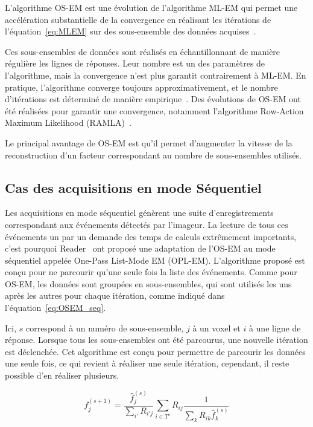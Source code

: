 L'algorithme OS-EM est une évolution de l'algorithme ML-EM  qui permet une accélération substantielle de la convergence en réalisant les itérations de l'équation~\ref{eq:MLEM} sur des sous-ensemble des données acquises~\cite{hudson1994accelerated}. 

Ces sous-ensembles de données sont réalisés en échantillonnant de manière régulière les lignes de réponses. Leur nombre est un des paramètres de l'algorithme, mais la convergence n'est plus garantit contrairement à ML-EM. En pratique, l'algorithme converge toujours approximativement, et le nombre d'itérations est déterminé de manière empirique~\cite{bailey2005positon}. Des évolutions de OS-EM ont été réalisées pour garantir une convergence, notamment l'algorithme Row-Action Maximum Likelihood (RAMLA)~\cite{browne1996row, chiang2004clinical}.

Le principal avantage de OS-EM est qu'il permet d'augmenter la vitesse de la reconstruction d'un facteur correspondant au nombre de sous-ensembles utilisés.

	\subsection{Cas des acquisitions en mode Séquentiel}
\label{lab:OPLEM}

Les acquisitions en mode séquentiel génèrent une suite d'enregistrements correspondant aux événements détectés par l'imageur. La lecture de tous ces événements un par un demande des temps de calculs extrêmement importants, c'est pourquoi Reader~\cite{reader2002one} ont proposé une adaptation de l'OS-EM au mode séquentiel appelée One-Pass List-Mode EM (OPL-EM). L'algorithme proposé est conçu pour ne parcourir qu'une seule fois la liste des événements. Comme pour OS-EM, les données sont groupées en sous-ensembles, qui sont utilisés les uns après les autres pour chaque itération, comme indiqué dans l'équation~\ref{eq:OSEM_seq}.

Ici, $s$ correspond à un numéro de sous-ensemble, $j$ à un voxel et $i$ à une ligne de réponse. Lorsque tous les sous-ensembles ont été parcourus, une nouvelle itération est déclenchée. Cet algorithme est conçu pour permettre de parcourir les données une seule fois, ce qui revient à réaliser une seule itération, cependant, il reste possible d'en réaliser plusieurs.

\begin{equation}
	f_j^{(s+1)}=\frac{\hat{f}_j^{(s)}}{\sum\limits_{i'}R_{i'j}}\sum\limits_{i \in T^s}R_{ij}\frac{1}{\sum\limits_{k}R_{ik}\hat{f}_k^{(s)}}
\label{eq:OSEM_seq}
\end{equation}

